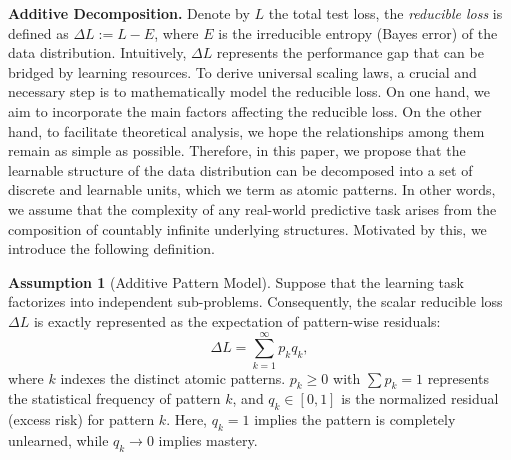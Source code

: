 \documentclass{article}
\theoremstyle{plain}
\theoremstyle{definition}
\newtheorem{assumption}[theorem]{Assumption}
\theoremstyle{remark}
\begin{document}
\textbf{Additive Decomposition.}
Denote by $L$ the total test loss, the \textit{reducible loss} is defined as $\Delta L := L - E$, where $E$ is the irreducible entropy (Bayes error) of the data distribution. Intuitively, $\Delta L$ represents the performance gap that can be bridged by learning resources. To derive universal scaling laws, a crucial and necessary step is to mathematically model the reducible loss. On one hand, we aim to incorporate the main factors affecting the reducible loss. On the other hand, to facilitate theoretical analysis, we hope the relationships among them remain as simple as possible. Therefore, in this paper, we propose that the learnable structure of the data distribution can be decomposed into a set of discrete and learnable units, which we term as atomic patterns. In other words, we assume that the complexity of any real-world predictive task arises from the composition of countably infinite underlying structures. Motivated by this, we introduce the following definition.

\begin{assumption}[Additive Pattern Model]
\label{assump:decomposition}
Suppose that the learning task factorizes into independent sub-problems. Consequently, the scalar reducible loss $\Delta L$ is exactly represented as the expectation of pattern-wise residuals:
\begin{equation}
    \label{eq:loss_decomposition}
    \Delta L = \sum_{k=1}^{\infty} p_k q_k,
\end{equation}
where $k$ indexes the distinct atomic patterns. $p_k \ge 0$ with $\sum p_k = 1$ represents the statistical frequency of pattern $k$, and $q_k \in [0, 1]$ is the normalized residual (excess risk) for pattern $k$. Here, $q_k=1$ implies the pattern is completely unlearned, while $q_k \to 0$ implies mastery.
\end{assumption}
\end{document}

